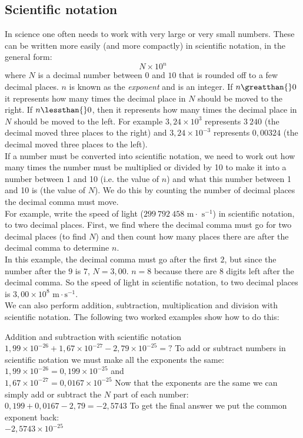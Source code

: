 \subsection*{Scientific notation}
In science one often needs to work with very large or very small numbers. These can be written more easily (and more compactly) in scientific notation, in the general form:       
    \begin{equation*}
    N \times 10^{n}
      \end{equation*}
where $N$ is a decimal number between $0$ and $10$ that is rounded off to a few decimal places. $n$ is known as the \textsl{exponent} and is an integer. If $n\greatthan{}0$ it represents how many times the decimal place in $N$ should be moved to the right. If $n\lessthan{}0$, then it represents how many times the decimal place in $N$ should be moved to the left. For example $3,24\ensuremath{\times}{10}^{3}$ represents $3~240$ (the decimal moved three places to the right) and $3,24\ensuremath{\times}{10}^{-3}$ represents $0,00324$ (the decimal moved three places to the left).\\
If a number must be converted into scientific notation, we need to work out how many times the number must be multiplied or divided by 10 to make it into a number between 1 and 10 (i.e. the value of $n$) and what this number between 1 and 10 is (the value of $N$). We do this by counting the number of decimal places the decimal comma must move.\\
For example, write the speed of light ($299 ~792 ~458 \text{ m} \cdot \text{ s}^{-1}$) in scientific notation, to two decimal places. First, we find where the decimal comma must go for two decimal places (to find $N$) and then count how many places there are after the decimal comma to determine $n$.\\
In this example, the decimal comma must go after the first $2$, but since the number after the $9$ is $7$, $N=3,00$. $n=8$ because there are $8$ digits left after the decimal comma. So the speed of light in scientific notation, to two decimal places is $3,00 \times 10^{8} \text{ m} \cdot \text{s}^{-1}$. \\
We can also perform addition, subtraction, multiplication and division with scientific notation. The following two worked examples show how to do this:
\begin{wex}{Addition and subtraction with scientific notation}
 {$1,99 \times 10^{-26} + 1,67 \times 10^{-27} - 2,79 \times 10^{-25} = ?$}
{
To add or subtract numbers in scientific notation we must make all the exponents the same:\\
$1,99 \times 10^{-26} = 0,199 \times 10^{-25}$ and\\
$1,67 \times 10^{-27} = 0,0167 \times 10^{-25}$
Now that the exponents are the same we can simply add or subtract the $N$ part of each number:\\
$0,199 + 0,0167 - 2,79 = -2,5743$ 
To get the final answer we put the common exponent back:\\
$-2,5743 \times 10^{-25}$
}
\end{wex}
